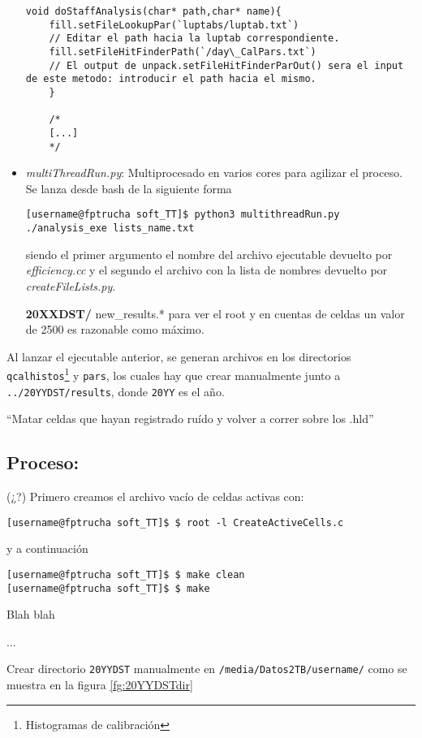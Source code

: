 \begin{itemize}
\begin{lstlisting}[style=customc]
void doStaffAnalysis(char* path,char* name){
	fill.setFileLookupPar(`luptabs/luptab.txt`)
	// Editar el path hacia la luptab correspondiente.
	fill.setFileHitFinderPath(`/day\_CalPars.txt`)
	// El output de unpack.setFileHitFinderParOut() sera el input de este metodo: introducir el path hacia el mismo.
	}
	
	/* 
	[...]
	*/
	\end{lstlisting}

	\item \textit{multiThreadRun.py}: Multiprocesado en varios cores para agilizar el proceso. Se lanza desde bash de la siguiente forma
	
	\begin{lstlisting}[style=customsh]
[username@fptrucha soft_TT]$ python3 multithreadRun.py ./analysis_exe lists_name.txt
	\end{lstlisting}
	siendo el primer argumento el nombre del archivo ejecutable devuelto por \textit{efficiency.cc} y el segundo el archivo con la lista de nombres devuelto por \textit{createFileLists.py}.
	
	\textbf{20XXDST/} new\_results.* para ver el root y en cuentas de celdas un valor de 2500 es razonable como máximo.
\end{itemize}

Al lanzar el ejecutable anterior, se generan archivos en los directorios \texttt{qcalhistos}\footnote{Histogramas de calibración} y \texttt{pars}, los cuales hay que crear manualmente junto a \texttt{../20YYDST/results}, donde \texttt{20YY} es el año.

``Matar celdas que hayan registrado ruído y volver a correr sobre los .hld''

\subsection{Proceso:}

(¿?) Primero creamos el archivo vacío de celdas activas con:
\begin{lstlisting}[style=customsh]
[username@fptrucha soft_TT]$ $ root -l CreateActiveCells.c
\end{lstlisting}
y a continuación
\begin{lstlisting}[style=customsh]
[username@fptrucha soft_TT]$ $ make clean
[username@fptrucha soft_TT]$ $ make
\end{lstlisting}

Blah blah

...

Crear directorio \texttt{20YYDST} manualmente en \texttt{/media/Datos2TB/username/} como se muestra en la figura \ref{fg:20YYDSTdir}

